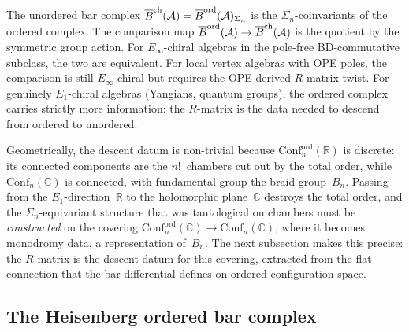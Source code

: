 \begin{remark}
\label{rem:ordered-vs-unordered}
The unordered bar complex
$\overline{B}^{\mathrm{ch}}(\mathcal{A})=\overline{B}^{\mathrm{ord}}(\mathcal{A})_{\Sigma_n}$
is the $\Sigma_n$-coinvariants of the ordered complex.
The comparison map
$\overline{B}^{\mathrm{ord}}(\mathcal{A})\to\overline{B}^{\mathrm{ch}}(\mathcal{A})$
is the quotient by the symmetric group action. For
$E_\infty$-chiral algebras in the pole-free
BD-commutative subclass, the two are equivalent. For local
vertex algebras with OPE poles, the comparison is still
$E_\infty$-chiral but requires the OPE-derived
$R$-matrix twist. For genuinely $E_1$-chiral
algebras (Yangians, quantum groups), the ordered complex
carries strictly more information: the $R$-matrix is the
data needed to descend from ordered to unordered.

Geometrically, the descent datum is non-trivial because
$\mathrm{Conf}_n^{\mathrm{ord}}(\mathbb R)$ is discrete:
its connected components are the $n!$~chambers cut out by
the total order, while
$\mathrm{Conf}_n(\mathbb C)$ is connected, with fundamental
group the braid group~$B_n$. Passing from the
$E_1$-direction~$\mathbb R$ to the holomorphic
plane~$\mathbb C$ destroys the total order, and the
$\Sigma_n$-equivariant structure that was tautological on
chambers must be \emph{constructed} on the covering
$\mathrm{Conf}_n^{\mathrm{ord}}(\mathbb C)\to
\mathrm{Conf}_n(\mathbb C)$, where it becomes monodromy
data, a representation of~$B_n$. The next subsection
makes this precise: the $R$-matrix is the descent datum
for this covering, extracted from the flat connection that
the bar differential defines on ordered configuration
space.
\end{remark}

\subsection{The Heisenberg ordered bar complex}
\label{subsec:ordered-bar-heisenberg}


